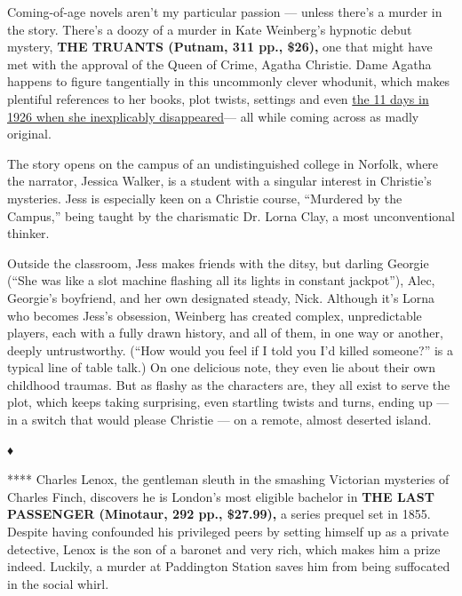 Coming-of-age novels aren't my particular passion --- unless there's a
murder in the story. There's a doozy of a murder in Kate Weinberg's
hypnotic debut mystery, \textbf{THE TRUANTS (Putnam, 311 pp., \$26),}
one that might have met with the approval of the Queen of Crime, Agatha
Christie. Dame Agatha happens to figure tangentially in this uncommonly
clever whodunit, which makes plentiful references to her books, plot
twists, settings and even
\href{https://www.nytimes3xbfgragh.onion/2019/06/11/books/agatha-christie-vanished-11-days-1926.html}{the
11 days in 1926 when she inexplicably disappeared}--- all while coming
across as madly original.

The story opens on the campus of an undistinguished college in Norfolk,
where the narrator, Jessica Walker, is a student with a singular
interest in Christie's mysteries. Jess is especially keen on a Christie
course, ``Murdered by the Campus,'' being taught by the charismatic Dr.
Lorna Clay, a most unconventional thinker.

Outside the classroom, Jess makes friends with the ditsy, but darling
Georgie (``She was like a slot machine flashing all its lights in
constant jackpot''), Alec, Georgie's boyfriend, and her own designated
steady, Nick. Although it's Lorna who becomes Jess's obsession, Weinberg
has created complex, unpredictable players, each with a fully drawn
history, and all of them, in one way or another, deeply untrustworthy.
(``How would you feel if I told you I'd killed someone?'' is a typical
line of table talk.) On one delicious note, they even lie about their
own childhood traumas. But as flashy as the characters are, they all
exist to serve the plot, which keeps taking surprising, even startling
twists and turns, ending up --- in a switch that would please Christie
--- on a remote, almost deserted island.

♦

**** Charles Lenox, the gentleman sleuth in the smashing Victorian
mysteries of Charles Finch, discovers he is London's most eligible
bachelor in \textbf{THE LAST PASSENGER (Minotaur, 292 pp., \$27.99),} a
series prequel set in 1855. Despite having confounded his privileged
peers by setting himself up as a private detective, Lenox is the son of
a baronet and very rich, which makes him a prize indeed. Luckily, a
murder at Paddington Station saves him from being suffocated in the
social whirl.


